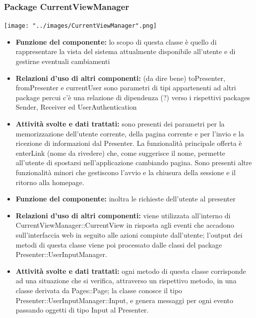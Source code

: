 \documentclass[a4paper,11pt]{article}
\begin{document}
		     \subsubsection{Package CurrentViewManager}
			\begin{center}
				\texttt{[image: "../images/CurrentViewManager".png]}
			\end{center}		    
		    	\begin{itemize}
		    \item\textbf{Funzione del componente:} lo scopo di questa classe è quello di rappresentare la vista del sistema attualmente disponibile all'utente e di gestirne eventuali cambiamenti 
			\item\textbf{Relazioni d'uso di altri componenti:} (da dire bene) toPresenter, fromPresenter e currentUser sono parametri di tipi appartenenti ad altri package percui c'è una 
relazione di dipendenza (?) verso i rispettivi packages Sender, Receiver ed UserAuthentication
			\item\textbf{Attività svolte e dati trattati:} sono presenti dei parametri per la memorizzazione dell'utente corrente, della pagina corrente e per l'invio e la ricezione di informazioni dal Presenter. La funzionalità principale offerta è enterLink (nome da rivedere) che, come suggerisce il nome, permette all'utente di spostarsi nell'applicazione cambiando pagina. Sono presenti altre funzionalità minori che gestiscono l'avvio e la chiusura della sessione e il ritorno alla homepage.
			\end{itemize}
			\begin{itemize}
			\item\textbf{Funzione del componente:} inoltra le richieste dell'utente al presenter
			\item\textbf{Relazioni d'uso di altri componenti:}  viene utilizzata all'interno di CurrentViewManager::CurrentView in risposta agli eventi che accadono sull'interfaccia web in seguito alle azioni compiute dall'utente; l'output dei metodi di questa classe viene poi processato dalle classi del package Presenter::UserInputManager.
			\item\textbf{Attività svolte e dati trattati:} ogni metodo di questa classe corrisponde ad una situazione che si verifica, attraverso un rispettivo metodo, in una classe derivata da Pages::Page; la classe conosce il tipo Presenter::UserInputManager::Input, e genera messaggi per ogni evento passando oggetti di tipo Input al Presenter.
			\end{itemize}
			
\end{document}
